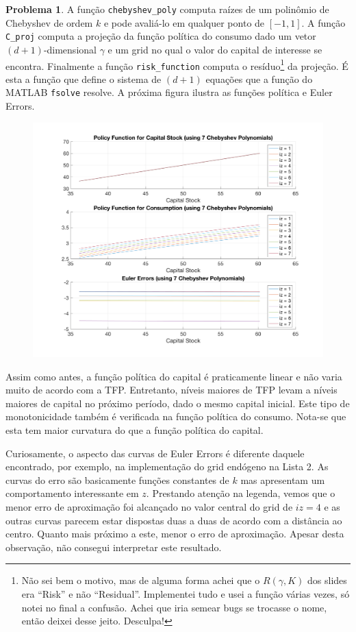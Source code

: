 \documentclass[11pt]{article}
\theoremstyle{definition}
\newtheorem{prob}{Problema}
\theoremstyle{solution}
\begin{document}
\begin{prob}
	A função \texttt{chebyshev\_poly} computa raízes de um polinômio de Chebyshev de ordem $k$ e pode avaliá-lo em qualquer ponto de $[-1,1]$. A função \texttt{C\_proj} computa a projeção da função política do consumo dado um vetor $(d+1)$-dimensional $\gamma$ e um grid no qual o valor do capital de interesse se encontra. Finalmente a função \texttt{risk\_function} computa o resíduo\footnote{Não sei bem o motivo, mas de alguma forma achei que o $R(\gamma, K)$ dos slides era ``Risk'' e não ``Residual''. Implementei tudo e usei a função várias vezes, só notei no final a confusão. Achei que iria semear bugs se trocasse o nome, então deixei desse jeito. Desculpa!} da projeção. É esta a função que define o sistema de $(d+1)$ equações que a função do MATLAB \texttt{fsolve} resolve. A próxima figura ilustra as funções política e Euler Errors.
	\begin{figure}[ht!]
		\centering
		\includegraphics[scale=0.25]{item1.png}
	\end{figure}
	
	Assim como antes, a função política do capital é praticamente linear e não varia muito de acordo com a TFP. Entretanto, níveis maiores de TFP levam a níveis maiores de capital no próximo período, dado o mesmo capital inicial. Este tipo de monotonicidade também é verificada na função política do consumo. Nota-se que esta tem maior curvatura do que a função política do capital.
	
	Curiosamente, o aspecto das curvas de Euler Errors é diferente daquele encontrado, por exemplo, na implementação do grid endógeno na Lista 2. As curvas do erro são basicamente funções constantes de $k$ mas apresentam um comportamento interessante em $z$. Prestando atenção na legenda, vemos que o menor erro de aproximação foi alcançado no valor central do grid de $iz = 4$ e as outras curvas parecem estar dispostas duas a duas de acordo com a distância ao centro. Quanto mais próximo a este, menor o erro de aproximação. Apesar desta observação, não consegui interpretar este resultado.
\end{prob}
\end{document}
